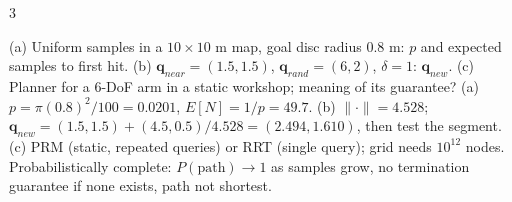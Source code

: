 \begin{multicols}{3}
\begin{examq}
\end{examq}
\begin{examq}
(a) Uniform samples in a $10\times10$ m map, goal disc radius 0.8 m: $p$ and expected samples to first hit. (b) $\mathbf q_{near}=(1.5,1.5)$, $\mathbf q_{rand}=(6,2)$, $\delta=1$: $\mathbf q_{new}$. (c) Planner for a 6-DoF arm in a static workshop; meaning of its guarantee?
\solution
(a) $p=\pi(0.8)^2/100=0.0201$, $E[N]=1/p=49.7$. 
(b) $\lVert\cdot\rVert=4.528$; $\mathbf q_{new}=(1.5,1.5)+(4.5,0.5)/4.528=\boxed{(2.494,1.610)}$, then test the segment. 
(c) PRM (static, repeated queries) or RRT (single query); grid needs $10^{12}$ nodes. Probabilistically complete: $P(\text{path})\to1$ as samples grow, no termination guarantee if none exists, path not shortest. \ \chk
\end{examq}
\end{multicols}
